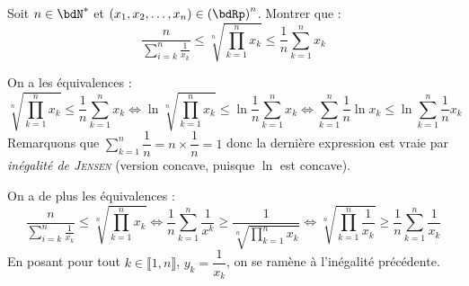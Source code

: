 \documentclass[a4paper,french,bookmarks]{article}
\begin{document}
\begin{exercise}{}{}
    Soit $n \in \bdN^*$ et $(x_1, x_2, \dots, x_n) \in \left(\bdRp\right)^n$. Montrer que :
    \[ \dfrac{n}{\displaystyle\sum_{i=k}^n \frac{1}{x_k}} \leq \sqrt[n]{\prod_{k=1}^n x_k} \leq \dfrac{1}{n}\sum_{k=1}^n x_k\]
    \begin{enumerate}
        \itt On a les équivalences :
        \[ \sqrt[n]{\prod_{k=1}^n x_k} \leq \dfrac{1}{n}\sum_{k=1}^n x_k \iff \ln{\sqrt[n]{\prod_{k=1}^n x_k}} \leq \ln{\dfrac{1}{n}\sum_{k=1}^n x_k} \iff \sum_{k=1}^n \dfrac{1}{n}\ln{x_k} \leq \ln{\sum_{k=1}^n \dfrac{1}{n} x_k}\]
        Remarquons que $\displaystyle\sum_{k=1}^n \dfrac{1}{n} = n\times \dfrac{1}{n} = 1$ donc la dernière expression est vraie par \textit{inégalité de \textsc{Jensen}} (version concave, puisque $\ln$ est concave).
        
        \itt On a de plus les équivalences :
        \[ \dfrac{n}{\displaystyle\sum_{i=k}^n \frac{1}{x_k}} \leq \sqrt[n]{\prod_{k=1}^n x_k} \iff \dfrac{1}{n}\sum_{k=1}^n \dfrac{1}{x^k} \geq \dfrac{1}{\sqrt[n]{\displaystyle\prod_{k=1}^n x_k}} \iff \sqrt[n]{\prod_{k=1}^n \dfrac{1}{x_k}} \geq \dfrac{1}{n}\sum_{k=1}^n \dfrac{1}{x_k}\]
        En posant pour tout $k \in \llbracket 1, n \rrbracket$, $y_k = \dfrac{1}{x_k}$, on se ramène à l'inégalité précédente.
    \end{enumerate}
\end{exercise}
\end{document}

